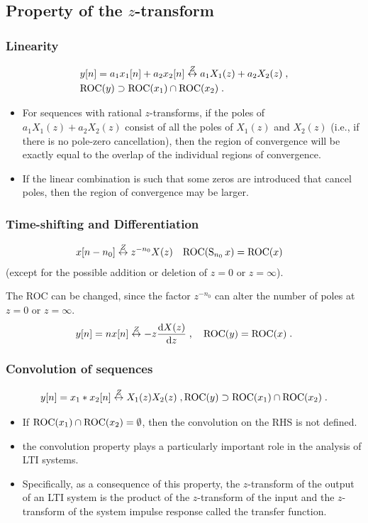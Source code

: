 \subsection{Property of the $z$-transform}
\begin{frame}
\frametitle{Linearity}
\begin{align*}
&y[n]= a_1 x_{1}[n]+ a_2 x_{2}[n]  \stackrel{Z}{\leftrightarrow} a_1 X_{1}(z)+a_2 X_{2}(z) \;,\\
&\mathrm{ROC}(y) \supset \mathrm{ROC}(x_{1}) \cap \mathrm{ROC}(x_2) \;.
\end{align*}
\begin{itemize}
\item For sequences with rational $z$-transforms, if the poles of $a_1X_{1}(z)+a_2X_{2}(z)$ consist of all the poles of $X_{1}(z)$ and $X_{2}(z)$ (i.e., if there is no pole-zero cancellation), then the region of convergence will be exactly equal to the overlap of the individual regions of convergence.
\item If the linear combination is such that some zeros are introduced that cancel poles, then the region of convergence may be larger.
\end{itemize}
\end{frame}

\begin{frame}
\frametitle{Time-shifting and Differentiation}
\begin{align*}
&x[n-n_{0}] \stackrel{Z}{\leftrightarrow} z^{-n_{0}}X(z) \quad \mathrm{ROC}(\operatorname{S}_{n_0} x)= \mathrm{ROC}(x) 
\end{align*}
(except for the possible addition or deletion of $z=0$ or $ z=\infty$).

\bigskip

The ROC can be changed, since the factor $z^{-n_{0}}$ can alter the number of poles at $z=0$ or $ z=\infty$.
$$
y[n]= n x[n] \stackrel{Z}{\leftrightarrow} - z \frac{\mathrm{d} X(z)}{\mathrm{d} z} \;, \quad \mathrm{ROC}(y)= \mathrm{ROC}(x) \;.
$$
\end{frame}

\begin{frame}
\frametitle{Convolution of sequences}
$$
y[n]= x_1 * x_2[n] \stackrel{Z}{\leftrightarrow} X_1(z) X_2(z) \;, \mathrm{ROC}(y) \supset \mathrm{ROC}(x_1) \cap \mathrm{ROC}(x_2) \;.
$$
\begin{itemize}
\item If $\mathrm{ROC}(x_1) \cap \mathrm{ROC}(x_2) = \emptyset$, then the convolution on the RHS is not defined.
\item  the convolution property plays a particularly important role in the analysis of LTI systems. 
\item Specifically, as a consequence of this property, the $z$-transform of the \alert{output} of an LTI system is the \alert{product} of the $z$-transform of the \alert{input} and the $z$-transform of the \alert{system impulse response} called the \alert{transfer function}.
\end{itemize}
\end{frame}

